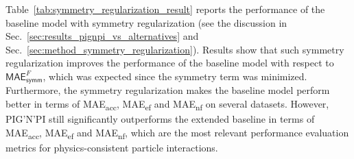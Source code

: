 \documentclass{article}
\newcommand{\abs}[1]{\lvert #1 \rvert}
\newcommand{\pignpi}{PIG'N'PI\xspace}
\begin{document}

Table~\ref{tab:symmetry_regularization_result} reports the performance of the baseline model with symmetry regularization (see the discussion in  Sec.~\ref{sec:results_pignpi_vs_alternatives} and Sec.~\ref{sec:method_symmetry_regularization}). Results show that such symmetry regularization improves the performance of the baseline model with respect to $\textsf{MAE}_\textsf{symm}^{F}$, which was expected since the symmetry term was minimized. Furthermore, the symmetry regularization makes the baseline model perform better in terms of \textsf{MAE\textsubscript{acc}}, \textsf{MAE\textsubscript{ef}} and \textsf{MAE\textsubscript{nf}} on several datasets. However, \pignpi still significantly outperforms the extended baseline in terms of \textsf{MAE\textsubscript{acc}}, \textsf{MAE\textsubscript{ef}} and \textsf{MAE\textsubscript{nf}}, which are the most relevant performance evaluation metrics for physics-consistent particle interactions. 




\end{document}
